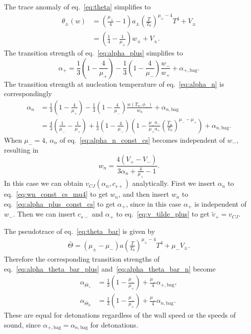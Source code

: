 The trace anomaly of eq.~\eqref{eq:theta} simplifies to
\begin{align}
\theta_\pm(w)
&= \left( \frac{\mu_\pm}{4} - 1 \right) a_\pm \left( \frac{T}{T_0} \right)^{\mu_\pm - 4} T^4 + V_\pm \\
&= \left( \frac{1}{4} - \frac{1}{\mu_\pm} \right) w_\pm + V_\pm.
\label{eq:theta_const_cs}
\end{align}
The transition strength of eq.~\eqref{eq:alpha_plus} simplifies to
\begin{equation}
\alpha_+ = \frac{1}{3} \left( 1 - \frac{4}{\mu_+} \right) - \frac{1}{3} \left(1 - \frac{4}{\mu_-} \right) \frac{w_-}{w_+} + \alpha_{+,\text{bag}}.
\label{eq:alpha_plus_const_cs}
\end{equation}
The transition strength at nucleation temperature of eq.~\eqref{eq:alpha_n} is correspondingly
\begin{align}
\alpha_n &= \frac{1}{3} \left( 1 - \frac{4}{\mu_+} \right) - \frac{1}{3} \left(1 - \frac{4}{\mu_-} \right) \frac{w(T_n, \phi_-)}{w_n} + \alpha_{n,\text{bag}} \\
&= \frac{4}{3} \left( \frac{1}{\mu_-} - \frac{1}{\mu_+} \right) + \frac{1}{3} \left( 1 - \frac{4}{\mu_-} \right)
\left( 1 - \frac{\mu_- a_-}{\mu_+ a_+} \left( \frac{T_n}{T_0} \right)^{\mu_- - \mu_+} \right) + \alpha_{n,\text{bag}}.
\label{eq:alpha_n_const_cs}
\end{align}
When $\mu_- = 4$, $\alpha_n$ of eq.~\eqref{eq:alpha_n_const_cs} becomes independent of $w_-$, resulting in
\begin{equation}
w_n = \frac{4 (V_+ - V_-)}{3 \alpha_n + \frac{4}{\mu_+} - 1}.
\label{eq:wn_const_cs_mu4}
\end{equation}
In this case we can obtain $v_{CJ}(\alpha_n, c_{s+})$ analytically.
First we insert $\alpha_n$ to eq.~\eqref{eq:wn_const_cs_mu4} to get $w_n$,
and then insert $w_n$ to eq.~\eqref{eq:alpha_plus_const_cs} to get $\alpha_+$,
since in this case $\alpha_+$ is independent of $w_-$.
Then we can insert $c_{s-}$ and $\alpha_+$ to eq.~\eqref{eq:v_tilde_plus} to get $\tilde{v}_+ = v_{CJ}$.

The pseudotrace of eq.~\eqref{eq:theta_bar} is given by
\begin{align}
\bar{\Theta} = (\mu_\pm - \mu_-) a \left(\frac{T}{T_0}\right)^{\mu_\pm - 4} T^4 + \mu_- V_\pm.
\end{align}
Therefore the corresponding transition strengths of eq.~\eqref{eq:alpha_theta_bar_plus} and~\eqref{eq:alpha_theta_bar_n} become
\begin{align}
\alpha_{\bar{\Theta}_+} &= \frac{1}{3} \left(1 - \frac{\mu_-}{\mu_+}\right) + \frac{\mu_-}{4} \alpha_{+,\text{bag}}, \\
\alpha_{\bar{\Theta}_n} &= \frac{1}{3} \left(1 - \frac{\mu_-}{\mu_+}\right) + \frac{\mu_-}{4} \alpha_{n,\text{bag}}.
\end{align}
These are equal for detonations regardless of the wall speed or the speeds of sound,
since $\alpha_{+,\text{bag}} = \alpha_{n,\text{bag}}$ for detonations.

